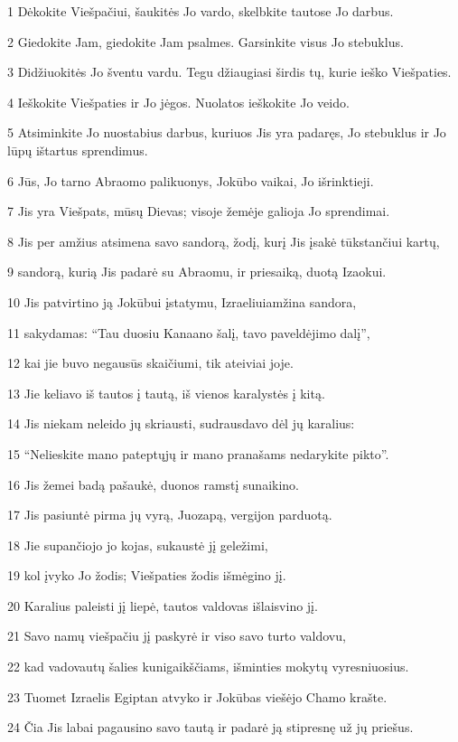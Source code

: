 \par 1 Dėkokite Viešpačiui, šaukitės Jo vardo, skelbkite tautose Jo darbus. 
\par 2 Giedokite Jam, giedokite Jam psalmes. Garsinkite visus Jo stebuklus. 
\par 3 Didžiuokitės Jo šventu vardu. Tegu džiaugiasi širdis tų, kurie ieško Viešpaties. 
\par 4 Ieškokite Viešpaties ir Jo jėgos. Nuolatos ieškokite Jo veido. 
\par 5 Atsiminkite Jo nuostabius darbus, kuriuos Jis yra padaręs, Jo stebuklus ir Jo lūpų ištartus sprendimus. 
\par 6 Jūs, Jo tarno Abraomo palikuonys, Jokūbo vaikai, Jo išrinktieji. 
\par 7 Jis yra Viešpats, mūsų Dievas; visoje žemėje galioja Jo sprendimai. 
\par 8 Jis per amžius atsimena savo sandorą, žodį, kurį Jis įsakė tūkstančiui kartų, 
\par 9 sandorą, kurią Jis padarė su Abraomu, ir priesaiką, duotą Izaokui. 
\par 10 Jis patvirtino ją Jokūbui įstatymu, Izraeliui­amžina sandora, 
\par 11 sakydamas: “Tau duosiu Kanaano šalį, tavo paveldėjimo dalį”, 
\par 12 kai jie buvo negausūs skaičiumi, tik ateiviai joje. 
\par 13 Jie keliavo iš tautos į tautą, iš vienos karalystės į kitą. 
\par 14 Jis niekam neleido jų skriausti, sudrausdavo dėl jų karalius: 
\par 15 “Nelieskite mano pateptųjų ir mano pranašams nedarykite pikto”. 
\par 16 Jis žemei badą pašaukė, duonos ramstį sunaikino. 
\par 17 Jis pasiuntė pirma jų vyrą, Juozapą, vergijon parduotą. 
\par 18 Jie supančiojo jo kojas, sukaustė jį geležimi, 
\par 19 kol įvyko Jo žodis; Viešpaties žodis išmėgino jį. 
\par 20 Karalius paleisti jį liepė, tautos valdovas išlaisvino jį. 
\par 21 Savo namų viešpačiu jį paskyrė ir viso savo turto valdovu, 
\par 22 kad vadovautų šalies kunigaikščiams, išminties mokytų vyresniuosius. 
\par 23 Tuomet Izraelis Egiptan atvyko ir Jokūbas viešėjo Chamo krašte. 
\par 24 Čia Jis labai pagausino savo tautą ir padarė ją stipresnę už jų priešus. 
